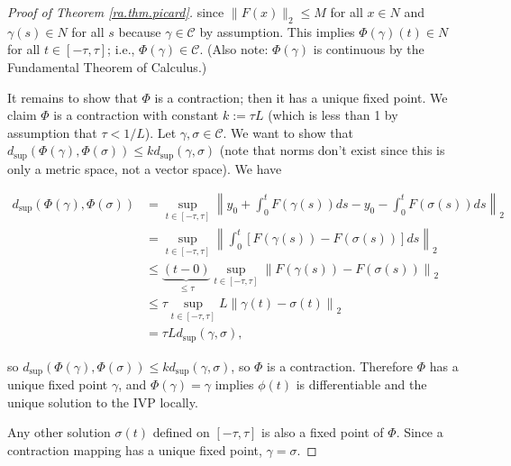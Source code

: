 \begin{proof}[Proof of Theorem \ref{ra.thm.picard}]
since \(\lVert F(x) \rVert_2 \leq M\) for all \(x \in N\) and \(\gamma(s) \in N\) for all \(s\) because \(\gamma \in \mathcal{C}\) by assumption. This implies \(\Phi(\gamma)(t) \in N\) for all \(t \in [-\tau, \tau]\); i.e., \(\Phi(\gamma) \in \mathcal{C}\). (Also note: \(\Phi(\gamma)\) is continuous by the Fundamental Theorem of Calculus.)

It remains to show that \(\Phi\) is a contraction; then it has a unique fixed point. We claim \(\Phi\) is a contraction with constant \(k := \tau L\) (which is less than 1 by assumption that \(\tau < 1/L\)). Let \(\gamma, \sigma \in \mathcal{C}\). We want to show that \(d_{\text{sup}} (\Phi(\gamma), \Phi(\sigma)) \leq k d_{\text{sup}}(\gamma, \sigma)\) (note that norms don't exist since this is only a metric space, not a vector space). We have

\begin{align*}
d_{\text{sup}} (\Phi(\gamma), \Phi(\sigma)) & = \sup_{t \in [-\tau, \tau]} \left\lVert y_0 + \int_0^t F(\gamma(s)) ds - y_0 - \int_0^t F(\sigma(s)) ds \right\rVert_2 
\\ & = \sup_{t \in [-\tau, \tau]} \left\lVert   \int_0^t \left[ F(\gamma(s)) - F(\sigma(s)) \right] ds \right\rVert_2 
\\ & \leq \underbrace{(t - 0)}_{\leq \tau}  \sup_{t \in [-\tau, \tau]} \left\lVert  F(\gamma(s)) - F(\sigma(s))  \right\rVert_2 
\\ & \leq \tau \sup_{t \in [-\tau, \tau]} L \left\lVert \gamma(t) - \sigma(t) \right\rVert_2 
\\ & = \tau L d_{\text{sup}}(\gamma, \sigma),
\end{align*}

so \(d_{\text{sup}} (\Phi(\gamma), \Phi(\sigma)) \leq k d_{\text{sup}}(\gamma, \sigma)\), so \(\Phi\) is a contraction. Therefore \(\Phi\) has a unique fixed point \(\gamma\), and \(\Phi(\gamma) = \gamma\) implies \(\phi(t)\) is differentiable and the unique solution to the IVP locally.

Any other solution \(\sigma(t)\) defined on \([-\tau, \tau]\) is also a fixed point of \(\Phi\). Since a contraction mapping has a unique fixed point, \(\gamma = \sigma\).

\end{proof}

